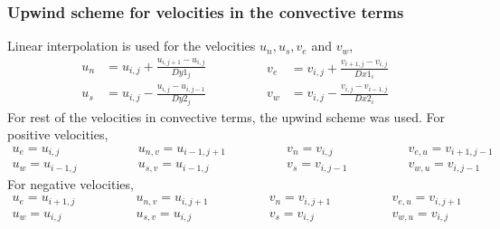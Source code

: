 \documentclass[12pt,a4paper,fleqn]{article}
\begin{document}
\subsubsection{Upwind scheme for velocities in the convective terms}
Linear interpolation is used for the velocities $u_n, u_s, v_e$ and $v_w$,
\begin{equation*}
\begin{aligned}
u_n &= u_{i,j} + \frac{u_{i,j+1} - u_{i,j}}{Dy1_j}\\
u_s &= u_{i,j} - \frac{u_{i,j} - u_{i,j-1}}{Dy2_j}
\end{aligned}
\qquad\qquad
\begin{aligned}
v_e &= v_{i,j} + \frac{v_{i+1,j} - v_{i,j}}{Dx1_i}\\
v_w &= v_{i,j} - \frac{v_{i,j} - v_{i-1,j}}{Dx2_i}
\end{aligned}
\end{equation*}
For rest of the velocities in convective terms, the upwind scheme was used. For positive velocities,
\begin{equation*}
\begin{aligned}
u_e = u_{i,j}\\
u_w = u_{i-1,j}
\end{aligned}
\qquad\qquad
\begin{aligned}
u_{n,v} = u_{i-1,j+1}\\
u_{s,v} = u_{i-1,j}
\end{aligned}
\qquad\qquad
\begin{aligned}
v_n = v_{i,j}\\
v_s = v_{i,j-1}
\end{aligned}
\qquad\qquad
\begin{aligned}
v_{e,u} = v_{i+1,j-1}\\
v_{w,u} = v_{i,j-1}
\end{aligned}
\end{equation*}
For negative velocities,
\begin{equation*}
\begin{aligned}
u_e = u_{i+1,j}\\
u_w = u_{i,j}
\end{aligned}
\qquad\qquad
\begin{aligned}
u_{n,v} = u_{i,j+1}\\
u_{s,v} = u_{i,j}
\end{aligned}
\qquad\qquad
\begin{aligned}
v_n = v_{i,j+1}\\
v_s = v_{i,j}
\end{aligned}
\qquad\qquad
\begin{aligned}
v_{e,u} = v_{i,j+1}\\
v_{w,u} = v_{i,j}
\end{aligned}
\end{equation*}
\end{document}
